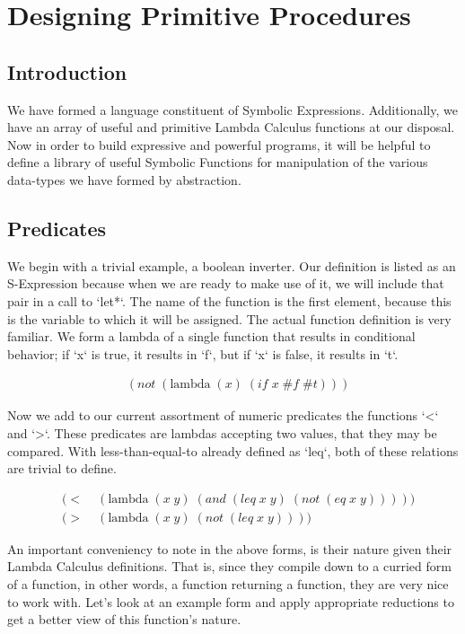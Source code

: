 
\chapter{Designing Primitive Procedures}
\section{Introduction}
We have formed a language constituent of Symbolic Expressions. Additionally, we 
have an array of useful and primitive Lambda Calculus functions at our disposal. 
Now in order to build expressive and powerful programs, it will be helpful to 
define a library of useful Symbolic Functions for manipulation of the various 
data-types we have formed by abstraction.

\section{Predicates}
We begin with a trivial example, a boolean inverter. Our definition is listed as 
an S-Expression because when we are ready to make use of it, we will include that 
pair in a call to `let*`. The name of the function is the first element, because 
this is the variable to which it will be assigned. The actual function definition 
is very familiar. We form a lambda of a single function that results in 
conditional behavior; if `x` is true, it results in `f`, but if `x` is false, it 
results in `t`.

\begin{align*}
& (not \; (\text{lambda} \; (x) \; (if \; x \; \#f \; \#t)))
\end{align*}

Now we add to our current assortment of numeric predicates the functions `<` and 
`>`. These predicates are lambdas accepting two values, that they may be compared. 
With less-than-equal-to already defined as `leq`, both of these relations are 
trivial to define.

\begin{align*}
& (< \; &(\text{lambda} \; (x \; y) \; (and \; (leq \; x \; y) \; (not \; (eq \; x \; y)))))
\\& (> \; &(\text{lambda} \; (x \; y) \; (not \; (leq \; x \; y))))
\end{align*}

An important conveniency to note in the above forms, is their nature given their 
Lambda Calculus definitions. That is, since they compile down to a curried form of 
a function, in other words, a function returning a function, they are very nice to 
work with. Let's look at an example form and apply appropriate reductions to get a 
better view of this function's nature.

